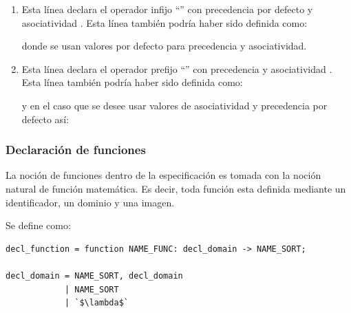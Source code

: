 \begin{enumerate}

\item 
\vspace{0.2cm}
Esta línea declara el operador infijo ``\textbtt{*}'' con precedencia por defecto y asociatividad . Esta línea también podría haber sido definida como:
\vspace{0.2cm}
\begin{center}
\end{center}
\vspace{0.2cm}
donde se usan valores por defecto para precedencia y asociatividad.

\item 
\vspace{0.2cm}
Esta línea declara el operador prefijo ``\textbtt{\%}'' con precedencia  y asociatividad . Esta línea también podría haber sido definida como:
\vspace{0.2cm}

\begin{center}
\end{center}
\vspace{0.2cm}
y en el caso que se desee usar valores de asociatividad y precedencia por defecto así:
\vspace{0.2cm}

\begin{center}
\end{center}
\end{enumerate}
\subsubsection{Declaración de funciones}
La noción de funciones dentro de la especificación es tomada con la noción natural de función matemática. Es decir, toda función esta definida mediante un identificador, un dominio y una imagen.

Se define  como:

\begin{lstlisting}[frame=shadowbox, language=specmag, linewidth=13cm]
decl_function = function NAME_FUNC: decl_domain -> NAME_SORT;

decl_domain = NAME_SORT, decl_domain
            | NAME_SORT
            | `$\lambda$`
\end{lstlisting}

